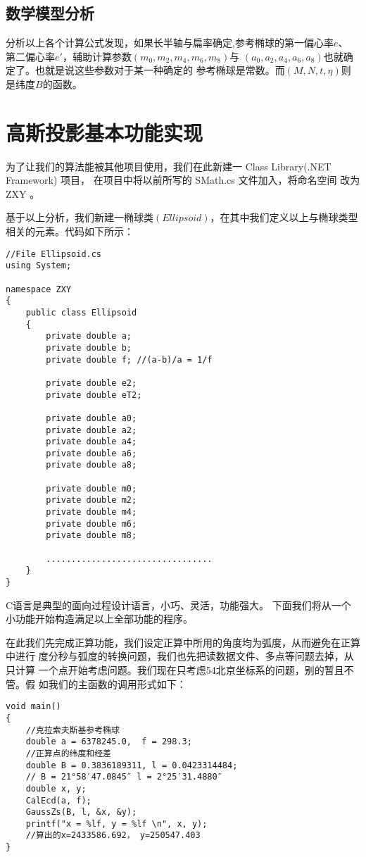 \subsection{数学模型分析}
分析以上各个计算公式发现，如果长半轴与扁率确定,参考椭球的第一偏心率$e$、
第二偏心率$e'$，辅助计算参数$(m_0, m_2, m_4, m_6, m_8)$与
$(a_0, a_2, a_4, a_6, a_8)$也就确定了。也就是说这些参数对于某一种确定的
参考椭球是常数。而$(M,N,t,\eta)$则是纬度$B$的函数。

\section{高斯投影基本功能实现}

为了让我们的算法能被其他项目使用，我们在此新建一 Class Library(.NET Framework) 项目，
在项目中将以前所写的 SMath.cs 文件加入，将命名空间
改为 ZXY 。

基于以上分析，我们新建一椭球类$(Ellipsoid)$，在其中我们定义以上与椭球类型
相关的元素。代码如下所示：
\begin{verbatim}
//File Ellipsoid.cs
using System;

namespace ZXY
{
    public class Ellipsoid
    {
        private double a;
        private double b;
        private double f; //(a-b)/a = 1/f

        private double e2;
        private double eT2;

        private double a0;
        private double a2;
        private double a4;
        private double a6;
        private double a8;

        private double m0;
        private double m2;
        private double m4;
        private double m6;
        private double m8;

        .................................
    }
}
\end{verbatim}

C语言是典型的面向过程设计语言，小巧、灵活，功能强大。
下面我们将从一个小功能开始构造满足以上全部功能的程序。

在此我们先完成正算功能，我们设定正算中所用的角度均为弧度，从而避免在正算中进行
度分秒与弧度的转换问题，我们也先把读数据文件、多点等问题去掉，从只计算
一个点开始考虑问题。我们现在只考虑54北京坐标系的问题，别的暂且不管。假
如我们的主函数的调用形式如下：
\begin{verbatim}
void main()
{
    //克拉索夫斯基参考椭球
    double a = 6378245.0,  f = 298.3;
    //正算点的纬度和经差
    double B = 0.3836189311, l = 0.0423314484;
    // B = 21°58′47.0845″ l = 2°25′31.4880″
    double x, y;
    CalEcd(a, f);
    GaussZs(B, l, &x, &y);
    printf("x = %lf, y = %lf \n", x, y);
    //算出的x=2433586.692， y=250547.403
}
\end{verbatim}

